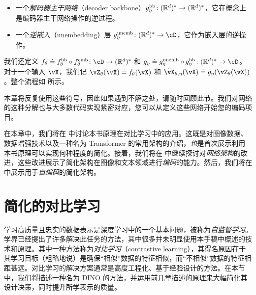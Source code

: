 \documentclass[../../book-main_zh.tex]{subfiles}
\begin{document}
\begin{itemize}
\begin{itemize}
        \item 一个\textit{解码器主干网络}（decoder backbone）\(g_{\eta}^{\mathrm{bb}} \colon (\mathbb{R}^{d})^{*} \to (\mathbb{R}^{d})^{*}\)，它在概念上是编码器主干网络操作的逆过程。
        \item 一个\textit{逆嵌入}（unembedding）层 \(g_{\eta}^{\unemb} \colon (\R^{d})^{*} \to \cD\)，它作为嵌入层的逆操作。
    \end{itemize}
    我们还定义 \(f_{\theta} \doteq f_{\theta}^{\backbone} \circ f_{\theta}^{\emb} \colon \cD \to (\R^{d})^{*}\) 和 \(g_{\eta} \doteq g_{\eta}^{\unemb} \circ g_{\eta}^{\backbone} \colon (\R^{d})^{*} \to \cD\)。对于一个输入 \(\vX\)，我们记 \(\vZ_{\theta}(\vX) \doteq f_{\theta}(\vX)\) 和 \(\hat{\vX}_{\theta, \eta}(\vX) \doteq g_{\eta}(\vZ_{\theta}(\vX))\)。整个流程如  所示。
\end{itemize}

本章将反复使用这些符号，因此如果遇到不解之处，请随时回顾此节。我们对网络的这种分解也与大多数代码实现紧密对应，您可以从定义这些网络开始您的编码项目。

在本章中，我们将在  中讨论本书原理在对比学习中的应用。这既是对图像数据、数据增强技术以及一种名为 Transformer 的常用架构的介绍，\textit{也}是首次展示利用本书原理可以实现何种程度的简化。接着，我们将在  中继续探讨对\textit{网络架构}的改进，这些改进展示了简化架构在图像和文本领域进行\textit{编码}的能力。然后，我们将在  中展示用于\textit{自编码}的简化架构。%


\section{简化的对比学习}\label{sec:contrastive_learning}

学习高质量且忠实的数据表示是深度学习中的一个基本问题，被称为\textit{自监督学习}。学界已经提出了许多解决此任务的方法，其中很多并未明显使用本手稿中概述的技术和原理。其中一种方法称为\textit{对比学习}（contrastive learning），其得名原因在于其学习目标（粗略地说）是确保“相似”数据的特征相似，而“不相似”数据的特征相距甚远。对比学习的解决方案通常是高度工程化、基于经验设计的方法。在本节中，我们将描述一种名为 DINO \citep{caron2021emerging} 的方法，并运用前几章描述的原理来大幅简化其设计决策，同时提升所学表示的质量。
\end{document}
